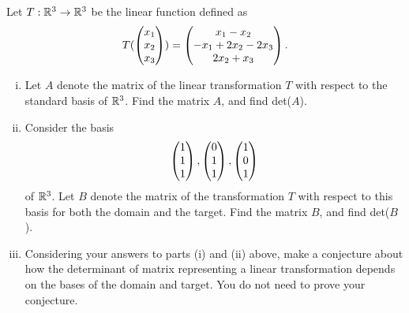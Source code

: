 \begin{question}
\normalfont
Let $T:{\mathbb R}^3\to{\mathbb R}^3$ be the linear function defined as
		\begin{align*}
			T(\begin{pmatrix} x_1\\ x_2\\ x_3\end{pmatrix}) = \begin{pmatrix} x_1-x_2\\ -x_1+2x_2-2x_3\\ 2x_2 + x_3\end{pmatrix}.
\end{align*}

\begin{enumerate}[(i)]

\item Let $A$ denote the matrix of the linear transformation $T$ with respect to the standard basis of ${\mathbb R}^3$. Find the matrix $A$, and find det($A$). \\
\item Consider the basis 
\[
\begin{pmatrix} 1\\ 1\\ 1\end{pmatrix}, \begin{pmatrix} 0\\ 1\\ 1\end{pmatrix},
 \begin{pmatrix} 1\\ 0\\ 1\end{pmatrix}
\]
of ${\mathbb R}^3$.  Let $B$ denote the matrix of the transformation $T$ with respect to this basis for both the domain and the target. Find the matrix $B$, and find det($B$). \\
\item Considering your answers to parts (i) and (ii) above, make a conjecture about how the determinant of matrix representing a linear transformation depends on the bases of the domain and target. You do not need to prove your conjecture. 
\end{enumerate}
\end{question}

